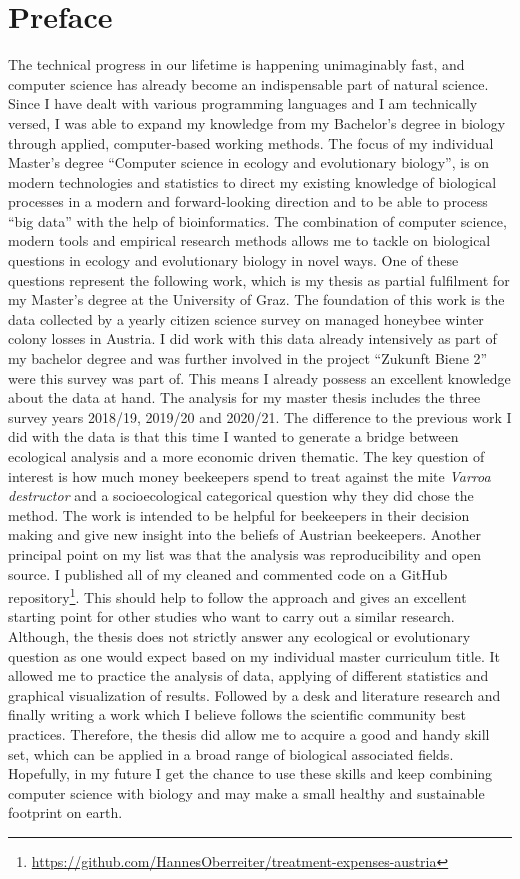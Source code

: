 \chapter*{Preface}
\label{sec:Preface}
\vspace*{-10mm}

The technical progress in our lifetime is happening unimaginably fast, and computer science has already become an indispensable part of natural science. Since I have dealt with various programming languages and I am technically versed, I was able to expand my knowledge from my Bachelor's degree in biology through applied, computer-based working methods. The focus of my individual Master's degree \enquote{Computer science in ecology and evolutionary biology}, is on modern technologies and statistics to direct my existing knowledge of biological processes in a modern and forward-looking direction and to be able to process \enquote{big data} with the help of bioinformatics. The combination of computer science, modern tools and empirical research methods allows me to tackle on biological questions in ecology and evolutionary biology in novel ways. One of these questions represent the following work, which is my thesis as partial fulfilment for my Master's degree at the University of Graz. The foundation of this work is the data collected by a yearly citizen science survey on managed honeybee winter colony losses in Austria. I did work with this data already intensively as part of my bachelor degree and was further involved in the project \enquote{Zukunft Biene 2} were this survey was part of. This means I already possess an excellent knowledge about the data at hand. The analysis for my master thesis includes the three survey years 2018/19, 2019/20 and 2020/21. The difference to the previous work I did with the data is that this time I wanted to generate a bridge between ecological analysis and a more economic driven thematic. The key question of interest is how much money beekeepers spend to treat against the mite \textit{Varroa destructor} and a socioecological categorical question why they did chose the method. The work is intended to be helpful for beekeepers in their decision making and give new insight into the beliefs of Austrian beekeepers. Another principal point on my list was that the analysis was reproducibility and open source. I published all of my cleaned and commented code on a GitHub repository\footnote{\url{https://github.com/HannesOberreiter/treatment-expenses-austria}}. This should help to follow the approach and gives an excellent starting point for other studies who want to carry out a similar research. Although, the thesis does not strictly answer any ecological or evolutionary question as one would expect based on my individual master curriculum title. It allowed me to practice the analysis of data, applying of different statistics and graphical visualization of results. Followed by a desk and literature research and finally writing a work which I believe follows the scientific community best practices. Therefore, the thesis did allow me to acquire a good and handy skill set, which can be applied in a broad range of biological associated fields. Hopefully, in my future I get the chance to use these skills and keep combining computer science with biology and may make a small healthy and sustainable footprint on earth.